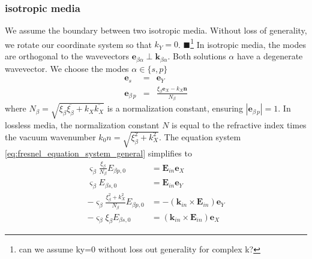 \documentclass[12pt,a4paper,twoside,openright,BCOR10mm,headsepline,titlepage,abstracton,chapterprefix,final]{scrreprt}
\newcommand\Vector[1]{{\mathbf{#1}}}
\newcommand\wavenumber{k}
\newcommand\Wavevector{\Vector{\wavenumber}}
\newcommand\scalarEfield{E}
\newcommand\Efield{\Vector{\scalarEfield}}
\newcommand{\remark}[1]{{\color{red}$\blacksquare$}\footnote{{\color{red}#1}}}
\newcommand\ppol{p}
\newcommand\spol{s}
\newcommand\normconst{N}
\begin{document}
\subsubsection{isotropic media}
We assume the boundary between two isotropic media.
Without loss of generality, we rotate our coordinate system so that $\wavenumber_Y = 0$.
\remark{can we assume ky=0 without loss out generality for complex k?}
In isotropic media, the modes are orthogonal to the wavevectors $\Vector{e}_{\beta\alpha} \perp \Wavevector_{\beta\alpha}$.
Both solutions $\alpha$ have a degenerate wavevector.
We choose the modes $\alpha \in \{ \spol, \ppol \}$
\begin{eqnarray}
 \Vector{e}_{\spol} &=& \Vector{e}_Y \\
 \Vector{e}_{\beta\,\ppol} &=& \frac{\xi_\beta \Vector{e}_X - \wavenumber_X \Vector{n}}{\normconst_\beta} 
\end{eqnarray}
where $\normconst_\beta = \sqrt{ \xi_\beta \overline{\xi_\beta} + \wavenumber_X \overline{\wavenumber_X}}$ is a normalization constant, ensuring $|\Vector{e}_{\beta\,\ppol}|=1$.
In lossless media, the normalization constant $\normconst$ is equal to the refractive index times the vacuum wavenumber
$\wavenumber_0 n = \sqrt{ \xi_\beta^2 + \wavenumber_X^2}$.
The equation system \eqref{eq:fresnel_equation_system_general} simplifies to
\begin{subequations}
  \begin{align}
    \varsigma_\beta \frac{\xi_\beta}{\normconst_\beta}  E_{\beta \ppol,0} &= \Efield_{in} \Vector{e}_X \\
    \varsigma_\beta E_{\beta \spol,0} &= \Efield_{in} \Vector{e}_Y \\
    - \varsigma_\beta \frac{\xi_\beta^2 + \wavenumber_X^2}{\normconst_\beta} E_{\beta\ppol,0} &= -(\Wavevector_{in} \times \Efield_{in}) \Vector{e}_Y  \\
    - \varsigma_\beta \xi_{\beta} E_{\beta \spol,0} &= (\Wavevector_{in} \times \Efield_{in}) \Vector{e}_X 
  \end{align}
\end{subequations}
\end{document}
